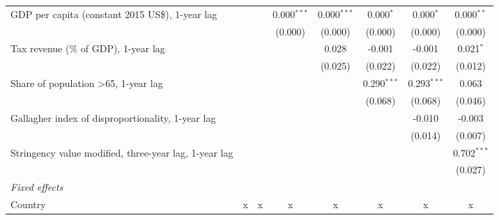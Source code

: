 \begin{tabular}{lccccccc}
   GDP per capita (constant 2015 US\$), 1-year lag                                            &             &             & 0.000$^{***}$ & 0.000$^{***}$ & 0.000$^{*}$   & 0.000$^{*}$   & 0.000$^{**}$\\   
                                                                                              &             &             & (0.000)       & (0.000)       & (0.000)       & (0.000)       & (0.000)\\   
   Tax revenue (\% of GDP), 1-year lag                                                        &             &             &               & 0.028         & -0.001        & -0.001        & 0.021$^{*}$\\   
                                                                                              &             &             &               & (0.025)       & (0.022)       & (0.022)       & (0.012)\\   
   Share of population >65, 1-year lag                                                        &             &             &               &               & 0.290$^{***}$ & 0.293$^{***}$ & 0.063\\   
                                                                                              &             &             &               &               & (0.068)       & (0.068)       & (0.046)\\   
   Gallagher index of disproportionality, 1-year lag                                          &             &             &               &               &               & -0.010        & -0.003\\   
                                                                                              &             &             &               &               &               & (0.014)       & (0.007)\\   
   Stringency value modified, three-year lag, 1-year lag                                      &             &             &               &               &               &               & 0.702$^{***}$\\   
                                                                                              &             &             &               &               &               &               & (0.027)\\   
   \emph{Fixed effects}\\
   Country                                                                                    & x           & x           & x             & x             & x             & x             & x\\  

\end{tabular}
